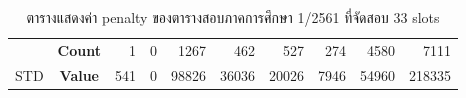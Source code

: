\begin{table}[]
{\begin{tabular}{@{}ccrrrrrrrr@{}}
    {\color[HTML]{FE0000} }                      & {\color[HTML]{FE0000} \textbf{Count}} & {\color[HTML]{FE0000} 1}       & {\color[HTML]{FE0000} 0}       & {\color[HTML]{FE0000} 1267}    & {\color[HTML]{FE0000} 462}     & {\color[HTML]{FE0000} 527}     & {\color[HTML]{FE0000} 274}     & {\color[HTML]{FE0000} 4580}    & {\color[HTML]{FE0000} 7111}      \\ \cmidrule(l){2-10} 
    \multirow{-2}{*}{{\color[HTML]{FE0000} STD}} & {\color[HTML]{FE0000} \textbf{Value}} & {\color[HTML]{FE0000} 541}     & {\color[HTML]{FE0000} 0}       & {\color[HTML]{FE0000} 98826}   & {\color[HTML]{FE0000} 36036}   & {\color[HTML]{FE0000} 20026}   & {\color[HTML]{FE0000} 7946}    & {\color[HTML]{FE0000} 54960}   & {\color[HTML]{FE0000} 218335}    \\ \bottomrule
    \end{tabular}%
    }
    \caption{ตารางแสดงค่า penalty ของตารางสอบภาคการศึกษา 1/2561 ที่จัดสอบ 33 slots}
    \label{tab:result_table_161_33}
\end{table}
